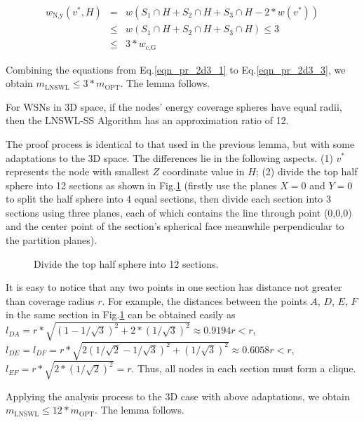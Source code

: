 \documentclass[journal,10pt]{IEEEtran}
\begin{document}
\begin{IEEEproof}
\begin{equation}
\label{eqn_pr_2d3_3}
\begin{array}{rcl}
w_\text{N,y}(v^{*},H)&{=}&w(S_1{\cap}H{+}S_2{\cap}H{+}S_3{\cap}H{-}2{*}w(v^{*}))\\
&{\leq}&w(S_1{\cap}H{+}S_2{\cap}H{+}S_3{\cap}H){\leq}3\\
&{\leq}&3{*}w_\text{c,G}
\end{array}
\end{equation}

Combining the equations from Eq.\eqref{eqn_pr_2d3_1} to Eq.\eqref{eqn_pr_2d3_3}, we obtain $m_\text{LNSWL}{\leq}3{*}m_\text{OPT}$. The lemma follows.
\end{IEEEproof}


\begin{lemma}
\label{lemma_3d_ratio12}
For WSNs in 3D space, if the nodes' energy coverage spheres have equal radii, then the LNSWL-SS Algorithm has an approximation ratio of 12.
\end{lemma}

\begin{IEEEproof}
The proof process is identical to that used in the previous lemma, but with some adaptations to the 3D space. The differences lie in the following aspects. (1) $v^{*}$ represents the node with smallest $Z$ coordinate value in $H$; (2) divide the top half sphere into 12 sections as shown in Fig.\ref{fig_3d12part} (firstly use the planes $X{=}0$ and $Y{=}0$ to split the half sphere into 4 equal sections, then divide each section into 3 sections using three planes, each of which contains the line through point (0,0,0) and the center point of the section's spherical face meanwhile perpendicular to the partition planes).

\begin{figure}[htb]
\caption{Divide the top half sphere into 12 sections.}
\label{fig_3d12part}
\end{figure}

It is easy to notice that any two points in one section has distance not greater than coverage radius $r$. For example, the distances between the points $A$, $D$, $E$, $F$ in the same section in Fig.\ref{fig_3d12part} can be obtained easily as $l_{DA}{=}r{*}\sqrt{(1{-}1/\sqrt{3})^2{+}2*(1/\sqrt{3})^2}{\approx}0.9194r{<}r$, $l_{DE}{=}l_{DF}{=}r{*}\sqrt{2(1/\sqrt{2}{-}1/\sqrt{3})^2{+}(1/\sqrt{3})^2}{\approx}0.6058r{<}r$, $l_{EF}{=}r{*}\sqrt{2{*}(1/\sqrt{2})^2}{=}r$. Thus, all nodes in each section must form a clique.

Applying the analysis process to the 3D case with above adaptations, we obtain $m_\text{LNSWL}{\leq}12{*}m_\text{OPT}$. The lemma follows.
\end{IEEEproof}
\end{document}
